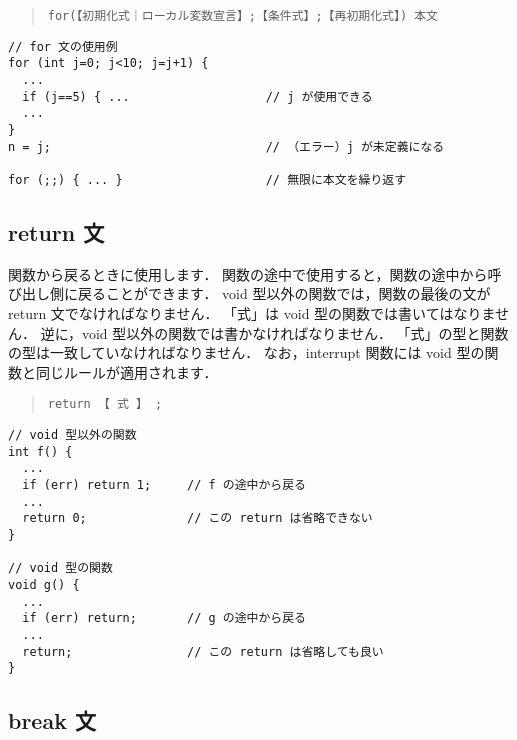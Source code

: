 \begin{quote}
\begin{verbatim}
for(【初期化式｜ローカル変数宣言】;【条件式】;【再初期化式】) 本文
\end{verbatim}
\end{quote}

\begin{mylist}
\begin{verbatim}
// for 文の使用例
for (int j=0; j<10; j=j+1) {
  ...
  if (j==5) { ...                   // j が使用できる
  ...
}
n = j;                              // （エラー）j が未定義になる

for (;;) { ... }                    // 無限に本文を繰り返す
\end{verbatim}
\end{mylist}

\subsection{return 文}

関数から戻るときに使用します．
関数の途中で使用すると，関数の途中から呼び出し側に戻ることができます．
void 型以外の関数では，関数の最後の文が return 文でなければなりません．
「式」は void 型の関数では書いてはなりません．
逆に，void 型以外の関数では書かなければなりません．
「式」の型と関数の型は一致していなければなりません．
なお，interrupt 関数には void 型の関数と同じルールが適用されます．

\begin{quote}
\begin{verbatim}
return 【 式 】 ;
\end{verbatim}
\end{quote}

\begin{mylist}
\begin{verbatim}
// void 型以外の関数
int f() {
  ...
  if (err) return 1;     // f の途中から戻る
  ...
  return 0;              // この return は省略できない
}

// void 型の関数
void g() {
  ...
  if (err) return;       // g の途中から戻る
  ...
  return;                // この return は省略しても良い
}
\end{verbatim}
\end{mylist}

\subsection{break 文}

